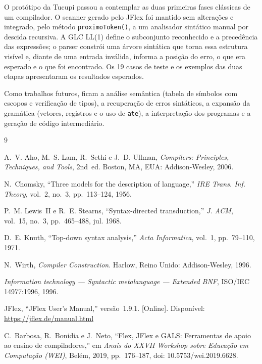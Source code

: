 \documentclass[conference,a4paper]{IEEEtran}
\newcommand{\cod}[1]{\texttt{#1}}
\begin{document}
O protótipo da Tucupi passou a contemplar as duas primeiras fases clássicas de um compilador. O scanner gerado pelo JFlex foi mantido sem alterações e integrado, pelo método \cod{proximoToken()}, a um analisador sintático manual por descida recursiva. A GLC LL(1) define o subconjunto reconhecido e a precedência das expressões; o parser constrói uma árvore sintática que torna essa estrutura visível e, diante de uma entrada inválida, informa a posição do erro, o que era esperado e o que foi encontrado. Os 19 casos de teste e os exemplos das duas etapas apresentaram os resultados esperados.

Como trabalhos futuros, ficam a análise semântica (tabela de símbolos com escopos e verificação de tipos), a recuperação de erros sintáticos, a expansão da gramática (vetores, registros e o uso de \cod{ate}), a interpretação dos programas e a geração de código intermediário.

\balance
\begin{thebibliography}{9}

A.~V. Aho, M.~S. Lam, R.~Sethi e J.~D. Ullman, \emph{Compilers: Principles, Techniques, and Tools}, 2nd~ed. Boston, MA, EUA: Addison-Wesley, 2006.

N.~Chomsky, ``Three models for the description of language,'' \emph{IRE Trans. Inf. Theory}, vol.~2, no.~3, pp.~113--124, 1956.

P.~M. Lewis~II e R.~E. Stearns, ``Syntax-directed transduction,'' \emph{J. ACM}, vol.~15, no.~3, pp.~465--488, jul. 1968.

D.~E. Knuth, ``Top-down syntax analysis,'' \emph{Acta Informatica}, vol.~1, pp.~79--110, 1971.

N.~Wirth, \emph{Compiler Construction}. Harlow, Reino Unido: Addison-Wesley, 1996.

\emph{Information technology --- Syntactic metalanguage --- Extended BNF}, ISO/IEC 14977:1996, 1996.

JFlex, ``JFlex User's Manual,'' versão~1.9.1. [Online]. Disponível: \url{https://jflex.de/manual.html}

C.~Barbosa, R.~Bonidia e J.~Neto, ``Flex, JFlex e GALS: Ferramentas de apoio ao ensino de compiladores,'' em \emph{Anais do XXVII Workshop sobre Educação em Computação (WEI)}, Belém, 2019, pp.~176--187, doi: 10.5753/wei.2019.6628.

\end{thebibliography}
\end{document}
